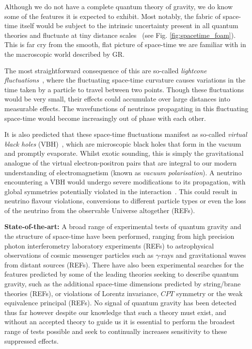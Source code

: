 \documentclass[a4paper,11pt]{article}
\begin{document}
Although we do not have a complete quantum theory of gravity, we do know some of the features it is expected to exhibit. Most notably, the fabric of space-time itself would be subject to the intrinsic uncertainty present in all quantum theories and fluctuate at tiny distance scales~\cite{PhysRev.97.511, Hawking} (see Fig. \ref{fig:spacetime_foam}). This is far cry from the smooth, flat picture of space-time we are familiar with in the macroscopic world described by GR. 

The most straightforward consequence of this are so-called \textit{lightcone fluctuations}~\cite{PauliLightcone, Ford1999, gr-qc/9909085}, where the fluctuating space-time curvature causes variations in the time taken by a particle to travel between two points. Though these fluctuations would be very small, their effects could accumulate over large distances into measurable effects. The wavefunctions of neutrinos propagating in this fluctuating space-time would become increasingly out of phase with each other.

It is also predicted that these space-time fluctuations manifest as so-called \textit{virtual black holes} (VBH)~\cite{Hawking1982,PhysRevD.53.3099}, which are microscopic black holes that form in the vacuum and promptly evaporate. Whilst exotic sounding, this is simply the gravitational analogue of the virtual electron-positron pairs that are integral to our modern understanding of electromagnetism (known as \textit{vacuum polarisation}). A neutrino encountering a VBH would undergo severe modifications to its propagation, with global symmetries potentially violated in the interaction~\cite{Anchordoqui:2005gj, PhysRevD.102.115003, Hellmann:2021jyz}. This could result in neutrino flavour violations, conversions to different particle types or even the loss of the neutrino from the observable Universe altogether (REFs).

\textbf{State-of-the-art:} A broad range of experimental tests of quantum gravity and the structure of space-time have been performed, ranging from high precision photon interferometry laboratory experiments (REFs) to astrophysical observations of cosmic messenger particles such as $\gamma$-rays and gravitational waves from distant sources (REFs). There have also been experimental searches for the features predicted by some of the leading theories seeking to describe quantum gravity, such as the additional space-time dimensions predicted by string/brane theories (REFs), or violations of Lorentz invariance, $CPT$ symmetry or the weak equivalence principal (REFs). No signal of quantum gravity has been detected thus far however despite our knowledge that such a theory must exist, and without an accepted theory to guide us it is essential to perform the broadest range of tests possible and seek to continually increases sensitivity to these suppressed effects. \\
\end{document}
